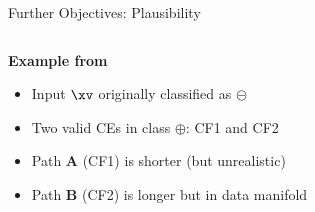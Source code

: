 \documentclass[11pt,compress,t,notes=noshow, aspectratio=169, xcolor=table, usenames,dvipsnames]{beamer}
\begin{document}
\begin{frame}{Further Objectives: Plausibility}
{\begin{columns}[c, totalwidth=\textwidth]
\begin{column}{0.56\textwidth}
\textbf{Example from } 
\begin{itemize}
    \item Input \textcolor{blue}{$\xv$} originally classified as $\pmb{\circleddash}$ 
    \item Two valid CEs in class $\pmb\oplus$: {\color{Red} CF1} and {\color{Green} CF2}
    \item {\color{Red} Path \textbf{A} (CF1)} is shorter (but unrealistic)
    \item {\color{Green} Path \textbf{B} (CF2)} is longer but in data manifold
\end{itemize}
\end{column}
\end{columns}
}

\end{frame}
\end{document}
